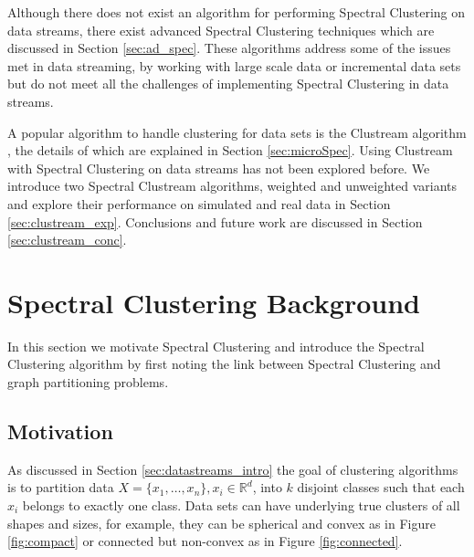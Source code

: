 Although there does not exist an algorithm for performing Spectral Clustering on data streams, there exist advanced Spectral Clustering techniques which are discussed in Section \ref{sec:ad_spec}. These algorithms address some of the issues met in data streaming, by working with large scale data or incremental data sets but do not meet all the challenges of implementing Spectral Clustering in data streams.

A popular algorithm to handle clustering for data sets is the Clustream algorithm \citep{Aggarwal2003}, the details of which are explained in Section \ref{sec:microSpec}. Using Clustream with Spectral Clustering on data streams has not been explored before.  We introduce two Spectral Clustream algorithms,  weighted and unweighted variants and explore their performance on simulated and real data in Section \ref{sec:clustream_exp}. Conclusions and future work are discussed in Section \ref{sec:clustream_conc}.


\section{Spectral Clustering Background}
\label{sec:sc_background}
In this section we motivate Spectral Clustering and introduce the Spectral Clustering algorithm by first noting the link between Spectral Clustering and graph partitioning problems. 

\subsection{Motivation}

As discussed in Section \ref{sec:datastreams_intro} the goal of clustering algorithms is to partition data  $X = \{ x_1, \ldots, x_n \}, x_i \in \mathbb{R}^d$, into $k$ disjoint classes such that each $x_i$ belongs to exactly one class. Data sets can have underlying true clusters of all shapes and sizes, for example, they can be spherical and convex as in Figure \ref{fig:compact} or connected but non-convex as in Figure \ref{fig:connected}.

